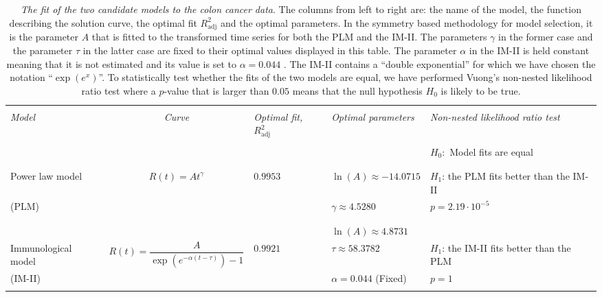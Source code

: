 \begin{table}[htbp!]
\begin{center}
    \caption[The fit of the two candidate models to the colon cancer data]{\textit{The fit of the two candidate models to the colon cancer data}. The columns from left to right are: the name of the model, the function describing the solution curve, the optimal fit $R^2_{\mathrm{adj}}$ and the optimal parameters. In the symmetry based methodology for model selection, it is the parameter $A$ that is fitted to the transformed time series for both the PLM and the IM-II. The parameters $\gamma$ in the former case and the parameter $\tau$ in the latter case are fixed to their optimal values displayed in this table. The parameter $\alpha$ in the IM-II is held constant meaning that it is not estimated and its value is set to $\alpha=0.044$ \cite{Palmer1883}. The IM-II contains a ``double exponential'' for which we have chosen the notation ``$\exp(e^x)$''. To statistically test whether the fits of the two models are equal, we have performed Vuong's non-nested likelihood ratio test \cite{Vuong1989} where a $p$-value that is larger than $0.05$ means that the null hypothesis $H_0$ is likely to be true.}
    \begin{tabular}{||p{2.3cm}|c|p{1.5cm}|p{2.0cm}|p{4.0cm}||}
    \hline\hline
         & & & & \\
       \textit{Model}  & \textit{Curve} & \textit{Optimal fit, $R^{2}_{\mathrm{adj}}$} & \textit{Optimal parameters} & \textit{Non-nested likelihood ratio test}\\
         & & & & \\
        & & & & $H_0:$ Model fits are equal\\
         & & & & \\
      \hline\hline     
      & & & & \\
      Power law model & $R(t)=At^{\gamma}$ & $0.9953$ & $\ln\left(A\right)\approx-14.0715$ & $H_1$: the PLM fits better than the IM-II\\
      (PLM) & & & $\gamma\approx 4.5280$ & $p=2.19\cdot 10^{-5}$\\
      & & & &\\
      \hline
      & & & & \\
        & & & $\ln\left(A\right)\approx 4.8731$ & \\
    Immunological model & $R(t)=\dfrac{A}{\exp\left(e^{-\alpha(t-\tau)}\right)-1}$ & $0.9921$ & $\tau\approx 58.3782$ & $H_1$: the IM-II fits better than the PLM\\
      (IM-II) & & & $\alpha=0.044$ (Fixed) & $p=1$\\
      & & & & \\
      \hline\hline
    \end{tabular}
    \label{tab:fit_data}
\end{center}
\end{table}



